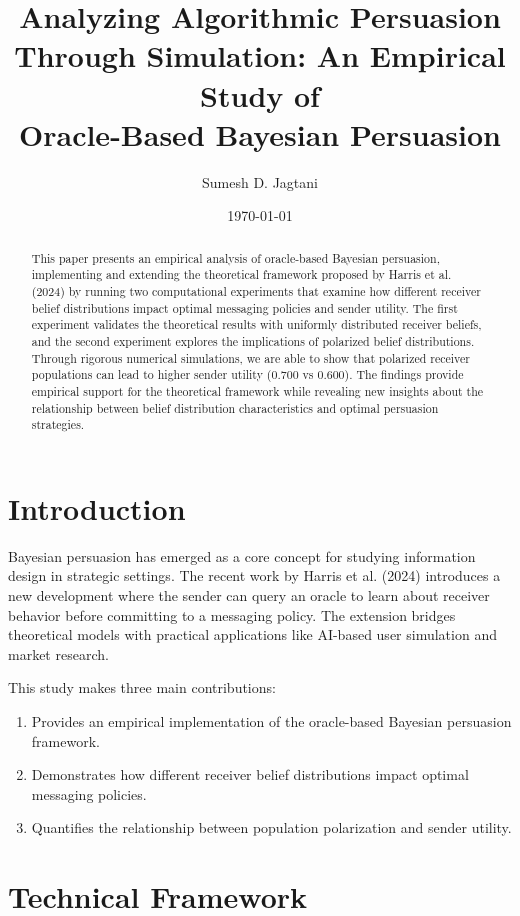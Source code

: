 \documentclass[12pt]{article}
\title{Analyzing Algorithmic Persuasion Through Simulation: An Empirical Study of\\
Oracle-Based Bayesian Persuasion}
\author{Sumesh D. Jagtani}
\date{\today}
\theoremstyle{plain}
\theoremstyle{definition}
\theoremstyle{remark}
\begin{document}
\maketitle

\begin{abstract}
This paper presents an empirical analysis of oracle-based Bayesian persuasion, implementing and extending the theoretical framework proposed by Harris et al. (2024) by running two computational experiments that examine how different receiver belief distributions impact optimal messaging policies and sender utility. The first experiment validates the theoretical results with uniformly distributed receiver beliefs, and the second experiment explores the implications of polarized belief distributions. Through rigorous numerical simulations, we are able to show that polarized receiver populations can lead to higher sender utility (0.700 vs 0.600). The findings provide empirical support for the theoretical framework while revealing new insights about the relationship between belief distribution characteristics and optimal persuasion strategies.
\end{abstract}

\section{Introduction}
Bayesian persuasion has emerged as a core concept for studying information design in strategic settings. The recent work by Harris et al. (2024) introduces a new development where the sender can query an oracle to learn about receiver behavior before committing to a messaging policy. The extension bridges theoretical models with practical applications like AI-based user simulation and market research.

This study makes three main contributions:
\begin{enumerate}
    \item Provides an empirical implementation of the oracle-based Bayesian persuasion framework.
    \item Demonstrates how different receiver belief distributions impact optimal messaging policies.
    \item Quantifies the relationship between population polarization and sender utility.
\end{enumerate}

\section{Technical Framework}
\end{document}

